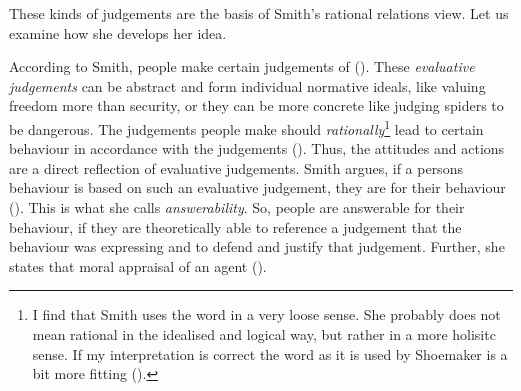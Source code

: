 \documentclass{article}
\begin{document}
%

These kinds of judgements are the basis of Smith's rational relations view.
Let us examine how she develops her idea.

According to Smith, people make certain judgements of  (\cite[p. 251]{smith2005responsibility}). These
\textit{evaluative judgements} can be abstract and form individual normative
ideals, like valuing freedom more than security, or they can be more concrete
like judging spiders to be dangerous. The judgements people make should
\textit{rationally}\footnote{I find that Smith uses the word
	  in a very loose sense. She probably does not mean
	 rational in the idealised and logical way, but rather in a more
	 holisitc sense. If my interpretation is correct the word
 as it is used by Shoemaker is a bit more
fitting (\cite[p. 23]{Shoemaker_2011}).} lead to certain behaviour in accordance with the
judgements (\cite[p. 244, p. 247, p. 250]{smith2005responsibility}). Thus, the
attitudes and actions are a direct reflection of evaluative judgements. Smith
argues, if a persons behaviour is based on such an
evaluative judgement, they are  for their behaviour (\cite[p.
577-578]{smith2012attributability}). This is what she calls
\textit{answerability}. So, people are answerable for their behaviour, if they
are theoretically able to reference a judgement that the behaviour was
expressing and to defend and justify that judgement. Further,
she states that moral appraisal of an agent  (\cite[p. 578]{smith2012attributability}).
\end{document}

